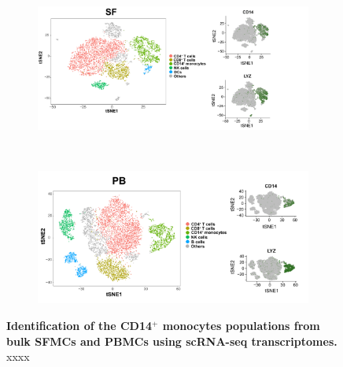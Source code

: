 \bigskip
\begin{figure}[H]
\centering
\begin{subfigure}[b]{0.70\textwidth}
\centering 
\includegraphics[width=\textwidth]{./Appendix/pdfs/Chapter5/PSA_SF_clusters_and_monocytes_markers}
\caption{}
\end{subfigure}
~
\begin{subfigure}[b]{0.70\textwidth} 
\centering
\includegraphics[width=\textwidth]{./Appendix/pdfs/Chapter5/PSA_PB_clusters_and_monocytes_markers}
\caption{}
\end{subfigure}
\caption[Identification of the CD14$^+$ monocytes populations from bulk SFMCs and PBMCs using scRNA-seq transcriptomes.]{\textbf{Identification of the CD14$^+$ monocytes populations from bulk SFMCs and PBMCs using scRNA-seq transcriptomes.} xxxx}
\label{figure:PsA_scRNAseq_SF_an_PB_monocytes_identification_from_bulk}
\end{figure}